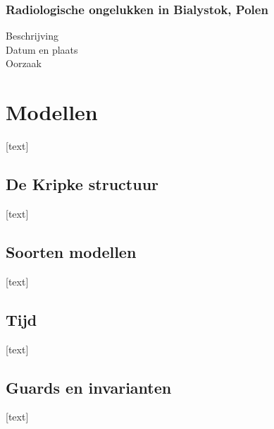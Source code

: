 \documentclass{article}
\begin{document}
			\subsubsection{Radiologische ongelukken in Bialystok, Polen}
			\begin{description}
				\item[Beschrijving] 
				
				\item[Datum en plaats] 
				
				\item[Oorzaak]
				
			\end{description}
			
		
	\newpage
	
	
	\section{Modellen}
	
	[text]
	
		\subsection{De Kripke structuur}
		
		[text]
		
		\subsection{Soorten modellen}
		
		[text]
		
		\subsection{Tijd}
		
		[text]
		
		\subsection{Guards en invarianten}
		
		[text]
		
\end{document}
